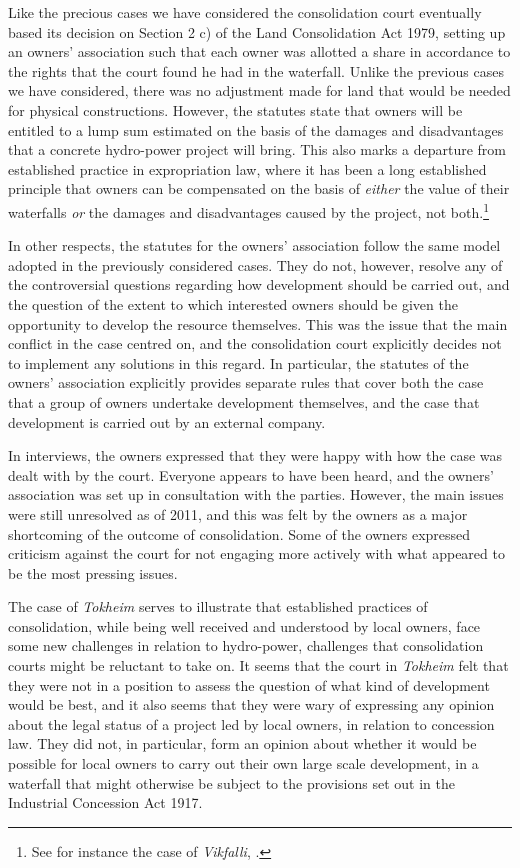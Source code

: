 Like the precious cases we have considered the consolidation court eventually based its decision on Section 2 c) of the Land Consolidation Act 1979, setting up an owners' association such that each owner was allotted a share in accordance to the rights that the court found he had in the waterfall. Unlike the previous cases we have considered, there was no adjustment made for land that would be needed for physical constructions. However, the statutes state that owners will be entitled to a lump sum estimated on the basis of the damages and disadvantages that a concrete hydro-power project will bring. This also marks a departure from established practice in expropriation law, where it has been a long established principle that owners can be compensated on the basis of \emph{either} the value of their waterfalls \emph{or} the damages and disadvantages caused by the project, not both.\footnote{See for instance the case of \emph{Vikfalli}, \cite{vikfalli71}.} 

In other respects, the statutes for the owners' association follow the same model adopted in the previously considered cases. They do not, however, resolve any of the controversial questions regarding how development should be carried out, and the question of the extent to which interested owners should be given the opportunity to develop the resource themselves. This was the issue that the main conflict in the case centred on, and the consolidation court explicitly decides not to implement any solutions in this regard. In particular, the statutes of the owners' association explicitly provides separate rules that cover both the case that a group of owners undertake development themselves, and the case that development is carried out by an external company. 

In interviews, the owners expressed that they were happy with how the case was dealt with by the court. Everyone appears to have been heard, and the owners' association was set up in consultation with the parties. However, the main issues were still unresolved as of 2011, and this was felt by the owners as a major shortcoming of the outcome of consolidation. Some of the owners expressed criticism against the court for not engaging more actively with what appeared to be the most pressing issues.

The case of \emph{Tokheim} serves to illustrate that established practices of consolidation, while being well received and understood by local owners, face some new challenges in relation to hydro-power, challenges that consolidation courts might be reluctant to take on. It seems that the court in \emph{Tokheim} felt that they were not in a position to assess the question of what kind of development would be best, and it also seems that they were wary of expressing any opinion about the legal status of a project led by local owners, in relation to concession law. They did not, in particular, form an opinion about whether it would be possible for local owners to carry out their own large scale development, in a waterfall that might otherwise be subject to the provisions set out in the Industrial Concession Act 1917.

